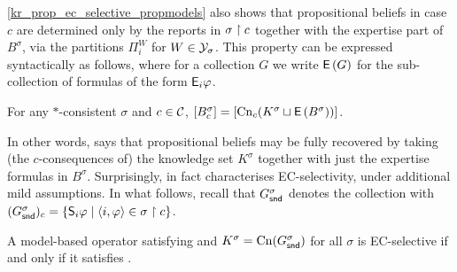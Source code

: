 \cref{kr_prop_ec_selective_propmodels} also shows that propositional beliefs
in case $c$ are determined only by the reports in $\sigma \upharpoonright c$ together with
the expertise part of $B^\sigma$, via the partitions $\Pi^W_i$ for $W \in
\mathcal{Y}_\sigma$. This property can be expressed syntactically as follows, where
for a collection $G$ we write $\operatorname{\mathsf{E}}\left({G}\right)$ for the sub-collection of formulas
of the form $\mathsf{E}_i\varphi$.

\begin{axiom}[\determination{}]
    For any $\ast$-consistent $\sigma$ and $c \in \mathcal{C}$,
    $
        \left[{B^\sigma_c}\right]
        =
        \left[{\operatorname{Cn}_c(K^\sigma \sqcup \operatorname{\mathsf{E}}\left({B^\sigma}\right))}\right]
    $.
\end{axiom}

In other words, \determination{} says that propositional beliefs may
be fully recovered by taking (the $c$-consequences of) the knowledge set
$K^\sigma$ together with just the expertise formulas in $B^\sigma$.
%
Surprisingly, \determination{} in fact characterises EC-selectivity,
under additional mild assumptions. In what follows, recall that $G^\sigma_{\mathsf{snd}}$
denotes the collection with $(G^\sigma_{\mathsf{snd}})_c = \{\mathsf{S}_i\varphi \mid \langle {i,
\varphi} \rangle \in \sigma \upharpoonright c\}$.

\begin{theorem}
    \label{kr_thm_ec_selectivity_characterisation}
    A model-based operator satisfying \consistency{} and $K^\sigma =
    \operatorname{Cn}(G^\sigma_{\mathsf{snd}})$ for all $\sigma$ is EC-selective if and only
    if it satisfies \determination{}.
\end{theorem}

